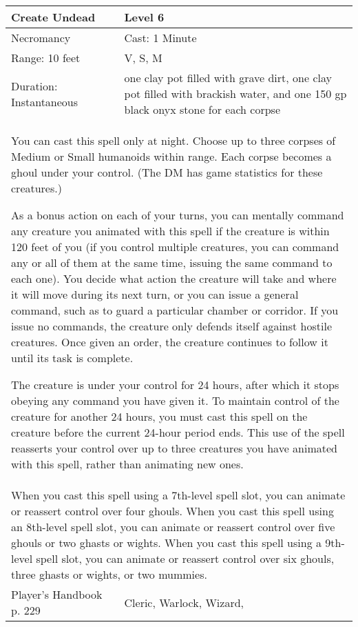 \documentclass[11pt]{report}
\begin{document}
\begin{table}[H]
	\begin{tabular}{||p{6cm}|p{6cm}||}
		\hline\hline
		\bf{Create Undead} & Level 6\\ \hline
		Necromancy & Cast: 1 Minute\\ \hline
		Range: 10 feet & V, S, M \\ \hline
		Duration: Instantaneous & one clay pot filled with grave dirt, one clay pot filled with brackish water, and one 150 gp black onyx stone for each corpse\\ \hline
		\multicolumn{2}{||p{12cm}||}{You can cast this spell only at night. Choose up to three corpses of Medium or Small humanoids within range. Each corpse becomes a ghoul under your control. (The DM has game statistics for these creatures.) 

As a bonus action on each of your turns, you can mentally command any creature you animated with this spell if the creature is within 120 feet of you (if you control multiple creatures, you can command any or all of them at the same time, issuing the same command to each one). You decide what action the creature will take and where it will move during its next turn, or you can issue a general command, such as to guard a particular chamber or corridor. If you issue no commands, the creature only defends itself against hostile creatures. Once given an order, the creature continues to follow it until its task is complete. 

The creature is under your control for 24 hours, after which it stops obeying any command you have given it. To maintain control of the creature for another 24 hours, you must cast this spell on the creature before the current 24-hour period ends. This use of the spell reasserts your control over up to three creatures you have animated with this spell, rather than animating new ones.}\\ \hline
		\multicolumn{2}{||p{12cm}||}{When you cast this spell using a 7th-level spell slot, you can animate or reassert control over four ghouls. 
When you cast this spell using an 8th-level spell slot, you can animate or reassert control over five ghouls or two ghasts or wights. 
When you cast this spell using a 9th-level spell slot, you can animate or reassert control over six ghouls, three ghasts or wights, or two mummies.}\\ \hline
Player's Handbook p. 229 & Cleric, Warlock, Wizard, \\ \hline\hline
	\end{tabular}
\end{table}
\end{document}
